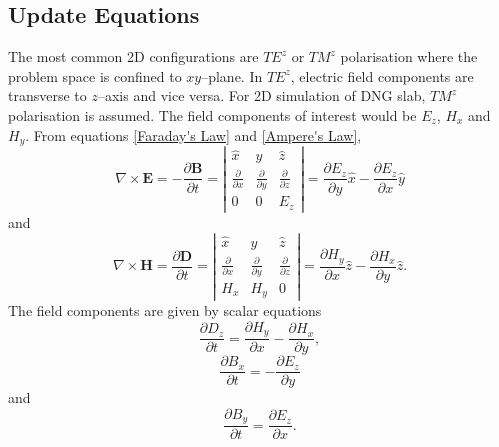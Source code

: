 \subsection{Update Equations}
The most common 2D configurations are $TE^z$ or $TM^z$ polarisation where the problem space is confined to $xy$--plane. In $TE^z$, electric field components are transverse to $z$--axis and vice versa. For 2D simulation of DNG slab, $TM^z$ polarisation is assumed. The field components of interest would be $E_z$, $H_x$ and $H_y$. From equations \ref{Faraday's Law} and \ref{Ampere's Law},
\begin{equation}
\nabla \times \textbf{E} = -\dfrac{\partial \textbf{B}}{\partial t} = \left| \begin{array}{ccc} \hat{x} & \hat{y} & \hat{z} \\ \frac{\partial}{\partial x} & \frac{\partial}{\partial y} & \frac{\partial}{\partial z} \\ 0 & 0 & E_z \end{array} \right| = \dfrac{\partial E_z}{\partial y} \hat{x} - \dfrac{\partial E_z}{\partial x} \hat{y}
\label{eq:Faraday'sLawExpansionTMz}
\end{equation}
and
\begin{equation}
\nabla \times \textbf{H} = \dfrac{\partial \textbf{D}}{\partial t} = \left| \begin{array}{ccc} \hat{x} & \hat{y} & \hat{z} \\ \frac{\partial}{\partial x} & \frac{\partial}{\partial y} & \frac{\partial}{\partial z} \\ H_x & H_y & 0 \end{array} \right| = \dfrac{\partial H_y}{\partial x} \hat{z} - \dfrac{\partial H_x}{\partial y} \hat{z}.
\label{eq:Ampere'sLawExpansionTMz}
\end{equation}
The field components are given by scalar equations
\begin{equation}
\dfrac{\partial D_z}{\partial t} = \dfrac{\partial H_y}{\partial x} - \dfrac{\partial H_x}{\partial y},
\label{eq:partialofDzbyt}
\end{equation}
\begin{equation}
\dfrac{\partial B_x}{\partial t} = -\dfrac{\partial E_z}{\partial y}
\label{eq:partialofBxbyt}
\end{equation}
and
\begin{equation}
\dfrac{\partial B_y}{\partial t} = \dfrac{\partial E_z}{\partial x}.
\label{eq:partialofBybyt}
\end{equation}
